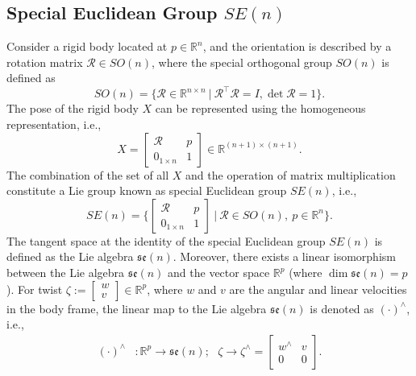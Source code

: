\documentclass[lettersize,journal]{IEEEtran}
\begin{document}
\subsection{Special Euclidean Group $SE(n)$}
Consider a rigid body located at $p \in \mathbb{R}^{n}$, and the orientation is described by a rotation matrix $\mathcal{R} \in SO(n)$, where the special orthogonal group $SO(n)$ is defined as
\begin{equation*}
    SO(n) = \{\mathcal{R} \in \mathbb{R}^{n \times n}~|~\mathcal{R}^{\top} \mathcal{R} = I, \det \mathcal{R} = 1\}.
\end{equation*}
The pose of the rigid body $X$ can be represented using the homogeneous representation, i.e., 
\begin{equation*}
    X = \begin{bmatrix}
        \mathcal{R} & p \\ 0_{1\times n} & 1
    \end{bmatrix}  \in \mathbb{R}^{(n+1)\times (n+1)}.
\end{equation*}
The combination of the set of all $X$ and the operation of matrix multiplication constitute a Lie group known as special Euclidean group $SE(n)$, i.e.,
\begin{equation*}
        SE(n)= \Big\{\begin{bmatrix}
        \mathcal{R} & p \\ 0_{1\times n} & 1
    \end{bmatrix} ~|~\mathcal{R}\in SO(n), ~p \in \mathbb{R}^n\Big\}. 
\end{equation*}
The tangent space at the identity of the special Euclidean group $SE(n)$ is defined as the Lie algebra $\mathfrak{se}(n)$. Moreover, there exists a linear isomorphism between the Lie algebra $\mathfrak{se}(n)$ and the vector space $\mathbb{R}^{p}$ (where $\dim \mathfrak{se}(n) = p$). For twist $\zeta := \begin{bmatrix}
     w \\ v
\end{bmatrix} \in \mathbb{R}^{p}$, where $w$ and $v$ are the angular and linear velocities in the body frame, the linear map to the Lie algebra $\mathfrak{se}(n)$ is denoted as $(\cdot)^{\wedge}$, i.e.,
\begin{align*}
    (\cdot)^{\wedge}&: \mathbb{R}^p \rightarrow \mathfrak{se}(n);~~~\zeta \rightarrow \zeta^{\wedge} = \begin{bmatrix}
        w^{\wedge} & v \\
         0 & 0
    \end{bmatrix}. \label{wedge}
\end{align*}
\end{document}
